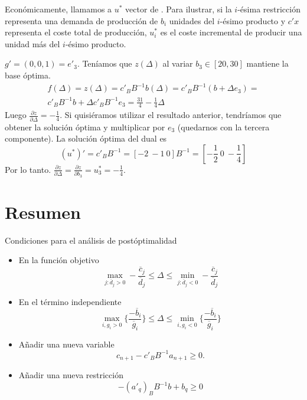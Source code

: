 \documentclass[PM.tex]{subfiles}
\begin{document}
Económicamente, llamamos a $u^*$ vector de .
Para ilustrar, si la $i$-ésima restricción representa una demanda de producción de $b_i$ unidades del $i$-ésimo producto y $c'x$ representa el coste total de producción, $u^*_i$ es el coste incremental de producir una unidad más del $i$-ésimo producto.

\begin{example}
$g'=(0,0,1)=e'_3$. Teníamos que $z(\Delta)$ al variar $b_3\in [20,30]$ mantiene la base óptima.
\begin{gather*}
f(\Delta)= z(\Delta)=c'_B B^{-1}b(\Delta)=c'_B B^{-1}(b+\Delta e_3)=\\
c'_B B^{-1} b +\Delta c'_B B^{-1} e_3 =\frac{31}{4}-\frac{1}{4}\Delta
\end{gather*}
Luego $\frac{\partial z}{\partial\Delta}=-\frac{1}{4}$. Si quisiéramos utilizar el resultado anterior, tendríamos que obtener la solución óptima y multiplicar por $e_3$ (quedarnos con la tercera componente). La solución óptima del dual es
\[(u^*)'=c'_B B^{-1}=[-2\ -1\ 0]B^{-1}=[-\frac{1}{2}\ 0\ -\frac{1}{4}]\]
Por lo tanto. $\frac{\partial z}{\partial\Delta}=\frac{\partial z}{\partial b_3}=u^*_3=-\frac{1}{4}$.
\end{example}
\newpage
\section{Resumen}
Condiciones para el análisis de postóptimalidad
\begin{itemize}
\item En la función objetivo
\[
\max_{j:\overline{d}_j >0}-\frac{\overline{c}_j}{\overline{d}_j} \leq \Delta \leq \min_{j:\overline{d}_j <0}-\frac{\overline{c}_j}{\overline{d}_j}
\]
\item En el término independiente
\[\max_{i, g_i>0}\{\frac{-\overline{b}_i}{\overline{g}_i}\}\leq\Delta \leq \min_{i,g_i<0}\{\frac{-\overline{b}_i}{\overline{g}_i}\}\]
\item Añadir una nueva variable
\[c_{n+1}-c'_B B^{-1} a_{n+1}\geq 0.\]
\item Añadir una nueva restricción
\[-(a'_q)_B B^{-1}b+b_q\geq 0\]
\end{itemize}

\end{document}
